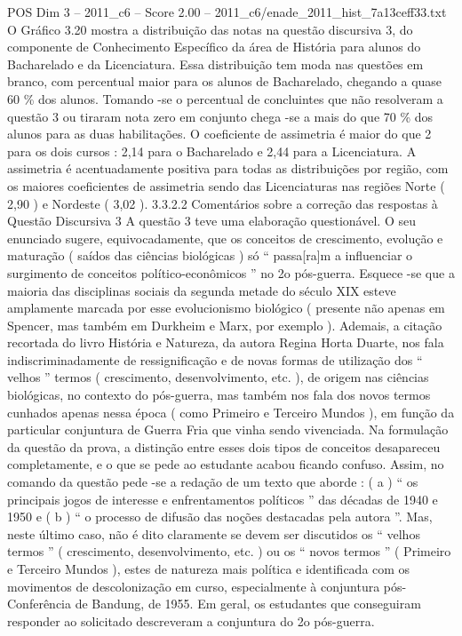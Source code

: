 \begin{textsample}{POS Dim 3 – 2011\_c6 – Score 2.00 – 2011\_c6/enade\_2011\_hist\_7a13ceff33.txt}
O Gráfico 3.20 mostra a distribuição das notas na questão discursiva 3, do componente de Conhecimento Específico da área de História para alunos do Bacharelado e da Licenciatura.
Essa distribuição tem moda nas questões em branco, com percentual maior para os alunos de Bacharelado, chegando a quase 60 \% dos alunos.
Tomando -se o percentual de concluintes que não resolveram a questão 3 ou tiraram nota zero em conjunto chega -se a mais do que 70 \% dos alunos para as duas habilitações.
O coeficiente de assimetria é maior do que 2 para os dois cursos : 2,14 para o Bacharelado e 2,44 para a Licenciatura.
A assimetria é acentuadamente positiva para todas as distribuições por região, com os maiores coeficientes de assimetria sendo das Licenciaturas nas regiões Norte ( 2,90 ) e Nordeste ( 3,02 ). 3.3.2.2 Comentários sobre a correção das respostas à Questão Discursiva 3 A questão 3 teve uma elaboração questionável.
O seu enunciado sugere, equivocadamente, que os conceitos de crescimento, evolução e maturação ( saídos das ciências biológicas ) só “ passa[ra]m a influenciar o surgimento de conceitos político-econômicos ” no 2o pós-guerra.
Esquece -se que a maioria das disciplinas sociais da segunda metade do século XIX esteve amplamente marcada por esse evolucionismo biológico ( presente não apenas em Spencer, mas também em Durkheim e Marx, por exemplo ).
Ademais, a citação recortada do livro História e Natureza, da autora Regina Horta Duarte, nos fala indiscriminadamente de ressignificação e de novas formas de utilização dos “ velhos ” termos ( crescimento, desenvolvimento, etc. ), de origem nas ciências biológicas, no contexto do pós-guerra, mas também nos fala dos novos termos cunhados apenas nessa época ( como Primeiro e Terceiro Mundos ), em função da particular conjuntura de Guerra Fria que vinha sendo vivenciada.
Na formulação da questão da prova, a distinção entre esses dois tipos de conceitos desapareceu completamente, e o que se pede ao estudante acabou ficando confuso.
Assim, no comando da questão pede -se a redação de um texto que aborde : ( a ) “ os principais jogos de interesse e enfrentamentos políticos ” das décadas de 1940 e 1950 e ( b ) “ o processo de difusão das noções destacadas pela autora ”.
Mas, neste último caso, não é dito claramente se devem ser discutidos os “ velhos termos ” ( crescimento, desenvolvimento, etc. ) ou os “ novos termos ” ( Primeiro e Terceiro Mundos ), estes de natureza mais política e identificada com os movimentos de descolonização em curso, especialmente à conjuntura pós-Conferência de Bandung, de 1955.
Em geral, os estudantes que conseguiram responder ao solicitado descreveram a conjuntura do 2o pós-guerra.

\end{textsample}
